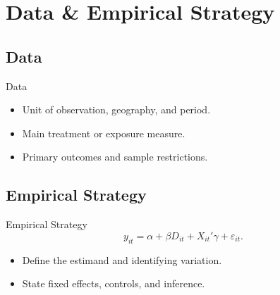 \section{Data \& Empirical Strategy}
\subsection{Data}

\begin{frame}{Data}
  \begin{itemize}
    \item Unit of observation, geography, and period.
    \item Main treatment or exposure measure.
    \item Primary outcomes and sample restrictions.
  \end{itemize}
\end{frame}

\subsection{Empirical Strategy}

\begin{frame}[label=main-identification]{Empirical Strategy}
  \begin{equation}
    y_{it}=\alpha+\beta D_{it}+X_{it}'\gamma+\varepsilon_{it}.
    \label{eq:main_spec}
  \end{equation}
  \begin{itemize}
    \item Define the estimand and identifying variation.
    \item State fixed effects, controls, and inference.
  \end{itemize}
\end{frame}
